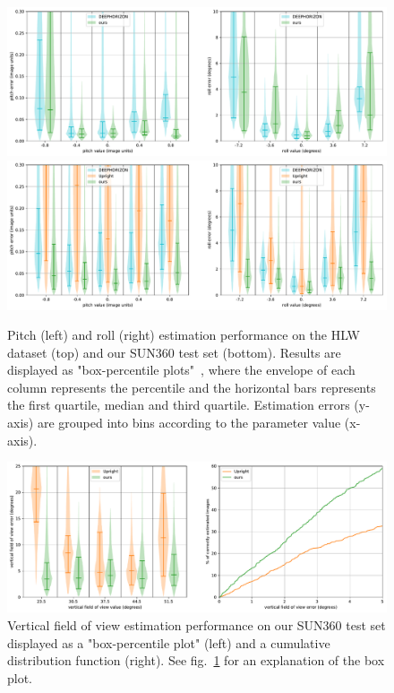 \begin{figure}
\centering
\includegraphics[width=\linewidth]{figures/method/pitch_roll_performance_hlw.pdf} \\
\includegraphics[width=\linewidth]{figures/method/pitch_roll_performance_sun360.pdf}
\caption{Pitch (left) and roll (right) estimation performance on the HLW dataset (top) and our SUN360 test set (bottom). Results are displayed as "box-percentile plots"~\cite{esty-jss-03}, where the envelope of each column represents the percentile and the horizontal bars represents the first quartile, median and third quartile. Estimation errors (y-axis) are grouped into bins according to the parameter value (x-axis).}
\label{fig:method_pitch_roll_performance}
\end{figure}

\begin{figure}
\centering
\includegraphics[width=\linewidth]{figures/method/vfov_performance_sun360.pdf}
\caption{Vertical field of view estimation performance on our SUN360 test set displayed as a "box-percentile plot" (left) and a cumulative distribution function (right). See fig.~\ref{fig:method_pitch_roll_performance} for an explanation of the box plot.
}
\label{fig:method_vfov_performance}
\vspace{-1em}
\end{figure}

